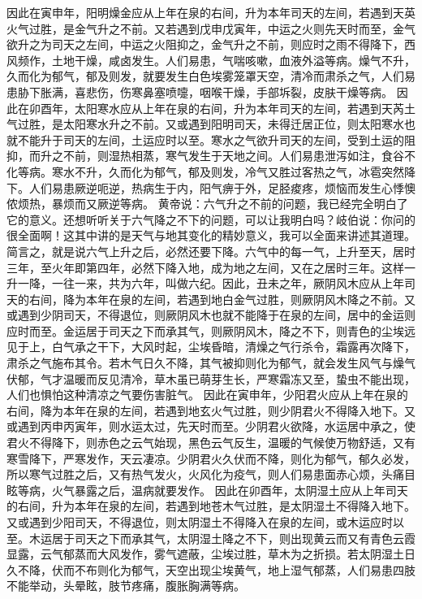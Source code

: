 \documentclass[a4paper,12pt,UTF8,twoside]{ctexbook}
\begin{document}
因此在寅申年，阳明燥金应从上年在泉的右间，升为本年司天的左间，若遇到天英火气过胜，是金气升之不前。又若遇到戊申戊寅年，中运之火则先天时而至，金气欲升之为司天之左间，中运之火阻抑之，金气升之不前，则应时之雨不得降下，西风频作，土地干燥，咸卤发生。人们易患，气喘咳嗽，血液外溢等病。燥气不升，久而化为郁气，郁及则发，就要发生白色埃雾笼罩天空，清冷而肃杀之气，人们易患胁下胀满，喜悲伤，伤寒鼻塞喷嚏，咽喉干燥，手部坼裂，皮肤干燥等病。
因此在卯酉年，太阳寒水应从上年在泉的右间，升为本年司天的左间，若遇到天芮土气过胜，是太阳寒水升之不前。又或遇到阳明司天，未得迁居正位，则太阳寒水也就不能升于司天的左间，土运应时以至。寒水之气欲升司天的左间，受到土运的阻抑，而升之不前，则湿热相蒸，寒气发生于天地之间。人们易患泄泻如注，食谷不化等病。寒水不升，久而化为郁气，郁及则发，冷气又胜过客热之气，冰雹突然降下。人们易患厥逆呃逆，热病生于内，阳气痹于外，足胫痠疼，烦恼而发生心悸懊侬烦热，暴烦而又厥逆等病。
黄帝说：六气升之不前的问题，我已经完全明白了它的意义。还想听听关于六气降之不下的问题，可以让我明白吗？岐伯说：你问的很全面啊！这其中讲的是天气与地其变化的精妙意义，我可以全面来讲述其道理。简言之，就是说六气上升之后，必然还要下降。六气中的每一气，上升至天，居时三年，至火年即第四年，必然下降入地，成为地之左间，又在之居时三年。这样一升一降，一往一来，共为六年，叫做六纪。因此，丑未之年，厥阴风木应从上年司天的右间，降为本年在泉的左间，若遇到地白金气过胜，则厥阴风木降之不前。又或遇到少阴司天，不得退位，则厥阴风木也就不能降于在泉的左间，居中的金运则应时而至。金运居于司天之下而承其气，则厥阴风木，降之不下，则青色的尘埃远见于上，白气承之干下，大风时起，尘埃昏暗，清燥之气行杀令，霜露再次降下，肃杀之气施布其令。若木气日久不降，其气被抑则化为郁气，就会发生风气与燥气伏郁，气才温暖而反见清冷，草木虽已萌芽生长，严寒霜冻又至，蛰虫不能出现，人们也惧怕这种清凉之气要伤害脏气。
因此在寅申年，少阳君火应从上年在泉的右间，降为本年在泉的左间，若遇到地玄火气过胜，则少阴君火不得降入地下。又或遇到丙申丙寅年，则水运太过，先天时而至。少阴君火欲降，水运居中承之，使君火不得降下，则赤色之云气始现，黑色云气反生，温暖的气候使万物舒适，又有寒雪降下，严寒发作，天云凄凉。少阴君火久伏而不降，则化为郁气，郁久必发，所以寒气过胜之后，又有热气发火，火风化为疫气，则人们易患面赤心烦，头痛目眩等病，火气暴露之后，温病就要发作。
因此在卯酉年，太阴湿土应从上年司天的右间，升为本年在泉的左间，若遇到地苍木气过胜，是太阴湿土不得降入地下。又或遇到少阳司天，不得退位，则太阴湿土不得降入在泉的左间，或木运应时以至。木运居于司天之下而承其气，太阴湿土降之不下，则出现黄云而又有青色云霞显露，云气郁蒸而大风发作，雾气遮蔽，尘埃过胜，草木为之折损。若太阴湿土日久不降，伏而不布则化为郁气，天空出现尘埃黄气，地上湿气郁蒸，人们易患四肢不能举动，头晕眩，肢节疼痛，腹胀胸满等病。
\end{document}
